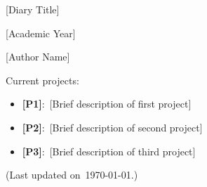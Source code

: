 \documentclass[12pt]{report}
\newcommand{\DiaryAuthor}{[Author Name]}
\newcommand{\DiaryAcademicYear}{[Academic Year]}
\newcommand{\DiaryTitle}{[Diary Title]}
\theoremstyle{definition}
\newcommand{\ptag}[1]{\vspace{1mm}\textbf{\small[\uppercase{#1}]}}
\begin{document}
\thispagestyle{empty}

\begin{center}
    \Huge{\DiaryTitle}

    \huge{\DiaryAcademicYear}
        
    \vspace{0.4cm}
    \large
    \DiaryAuthor
       
    \vspace{0.9cm}
\end{center}

\vspace{0.9cm}
Current projects:
\begin{itemize}
  \item \ptag{p1}:~[Brief description of first project]
  \item \ptag{p2}:~[Brief description of second project]
  \item \ptag{p3}:~[Brief description of third project]
\end{itemize}
\vspace{0.9cm}

\vfill
\begin{center}
  (Last updated on~\today.)
\end{center}

\pagestyle{plain}


\printbibliography
\vfill
\end{document}
